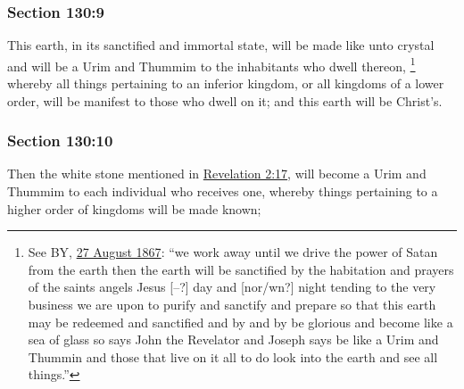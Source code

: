 	\subsubsection{Section 130:9} %
		\label{DC130-9}

		This earth, in its sanctified and immortal state, will be made like unto crystal and will be a Urim and Thummim to the inhabitants who dwell thereon,%
			\footnote{%
				See BY, \hyperref[EMS-1867-BY-27-AUG-1867]{27 August 1867}: ``we work away until we drive the power of Satan from the earth then the earth will be sanctified by the habitation and prayers of the saints angels Jesus [--?] day and [nor/wn?] night tending to the very business we are upon to purify and sanctify and prepare so that this earth may be redeemed and sanctified and by and by be glorious and become like a sea of glass so says John the Revelator and Joseph says be like a Urim and Thummin and those that live on it all to do look into the earth and see all things.''
				}
		whereby all things pertaining to an inferior kingdom, or all kingdoms of a lower order, will be manifest to those who dwell on it; and this earth will be Christ's.


	\subsubsection{Section 130:10} %
		\label{DC130-10}

		Then the white stone mentioned in \hyperref[REVELATIONNT-2-17]{Revelation 2:17}, will become a Urim and Thummim to each individual who receives one, whereby things pertaining to a higher order of kingdoms will be made known;


